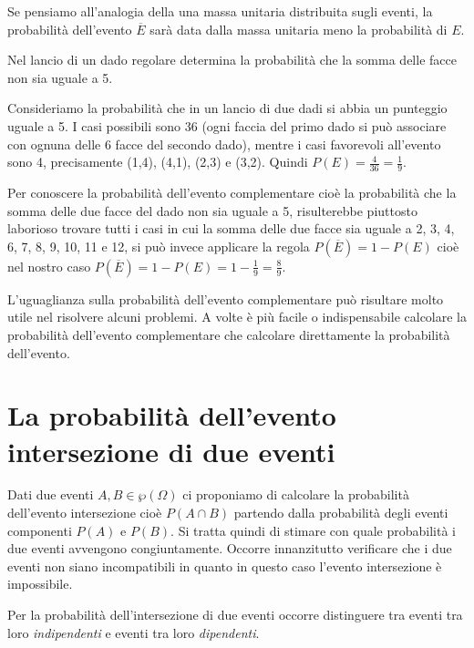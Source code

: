 Se pensiamo all'analogia della una massa unitaria distribuita sugli eventi, la probabilità dell'evento $\overline E$ sarà data dalla massa unitaria meno la probabilità di $E$.

\begin{exrig}
\begin{esempio}
Nel lancio di un dado regolare determina la probabilità che la somma delle facce non sia uguale a 5.

Consideriamo la probabilità che in un lancio di due dadi si abbia un punteggio uguale a 5. I casi possibili sono 36 (ogni faccia del primo dado si può associare con ognuna delle 6 facce del secondo dado), mentre i casi favorevoli all'evento sono 4, precisamente (1,4), (4,1), (2,3) e (3,2). Quindi $P(E)=\frac 4{36}=\frac 1 9$.

Per conoscere la probabilità dell'evento complementare cioè la probabilità che la somma delle due facce del dado non sia uguale a 5, risulterebbe piuttosto laborioso trovare tutti i casi in cui la somma delle due facce sia uguale a 2, 3, 4, 6, 7, 8, 9, 10, 11 e 12, si può invece applicare la regola $P(\overline E)=1-P(E)$ cioè nel nostro caso $P(\overline E)=1-P(E)=1-\frac 1 9=\frac 8 9$.
\end{esempio}
\end{exrig}

\osservazione L'uguaglianza sulla probabilità dell'evento complementare può risultare molto utile nel risolvere alcuni problemi. A volte è più facile o indispensabile calcolare la probabilità dell'evento complementare che calcolare direttamente la probabilità dell'evento.

\vspazio{}

\section{La probabilità dell'evento intersezione di due eventi}
Dati due eventi $A,B\in \wp (\Omega )$ ci proponiamo di calcolare la probabilità dell'evento intersezione cioè $P(A\cap B)$ partendo dalla probabilità degli eventi componenti $ P(A) $ e $ P(B) $. Si tratta quindi di stimare con quale probabilità i due eventi avvengono congiuntamente. Occorre innanzitutto verificare che i due eventi non siano incompatibili in quanto in questo caso l'evento intersezione è impossibile.

Per la probabilità dell'intersezione di due eventi occorre distinguere tra eventi tra loro \emph{indipendenti} e eventi tra loro \emph{dipendenti}.

